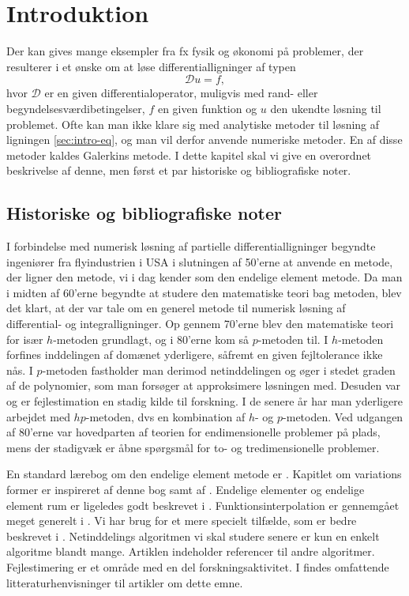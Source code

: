 \chapter{Introduktion}

Der kan gives mange eksempler fra fx fysik og økonomi på problemer,
der resulterer i et ønske om at løse differentialligninger af typen
\begin{equation} \label{sec:intro-eq}
{\mathcal D}u = f,
\end{equation}
hvor $\mathcal D$ er en given differentialoperator, muligvis med rand-
eller be\-gyn\-del\-ses\-vær\-di\-be\-tin\-gel\-ser, $f$ en given
funktion og $u$ den
ukendte løsning til problemet. Ofte kan man ikke klare sig med
analytiske metoder til løsning af ligningen \eqref{sec:intro-eq}, og
man vil derfor anvende numeriske metoder. En af disse metoder kaldes
Galerkins metode. I dette kapitel skal vi give en overordnet
beskrivelse af denne, men først et par historiske og bibliografiske noter.

\section{Historiske og bibliografiske noter}
I forbindelse med numerisk løs\-ning af partielle differentialligninger
begyndte in\-gen\-iører fra flyindustrien i USA i slutningen af 50'erne at
anvende en metode, der ligner den metode, vi i dag kender som den
endelige element metode. Da man i midten af 60'erne begyndte at studere den
matematiske teori bag metoden, blev det klart, at der var tale om en
generel metode til numerisk løsning af differential- og
integralligninger. Op gennem 70'erne blev den matematiske teori for
især $h$-metoden grundlagt, og i 80'erne kom så $p$-metoden til. I
$h$-metoden  forfines ind\-de\-ling\-en af domænet yderligere,
såfremt en given fejltolerance ikke nås. I $p$-metoden
fastholder man derimod netinddelingen og øger i stedet graden af de
polynomier, som man forsøger at approksimere løsningen med.
Desuden var og er fejlestimation en stadig kilde til
forsk\-ning. I de senere år har man yderligere arbejdet med $hp$-metoden, dvs en
kombination af $h$- og $p$-metoden. Ved udgangen af 80'erne var
hovedparten af teorien for endimensionelle problemer på plads, mens
der stadigvæk er åbne spørgsmål for to- og tredimensionelle problemer.

En standard lærebog om den endelige element metode er
\cite{ciarlet78}. Kapitlet om variations former er inspireret af denne
bog samt af \cite{babuska82}. Endelige elementer og endelige element
rum er ligeledes godt beskrevet i \cite{ciarlet78}.
Funktionsinterpolation er gennemgået meget generelt i
\cite{ciarlet78}. Vi har brug for et mere specielt tilfælde, som er
bedre beskrevet i \cite{hugger-pol}. Netinddelings algoritmen vi skal studere
senere er kun en enkelt algoritme blandt mange. Artiklen \cite{hugger-net}
indeholder referencer til andre algoritmer. Fejlestimering er et
område med en del forskningsaktivitet. I
\cite{babuska1,babuska2,babuska3} findes omfattende
litteraturhenvisninger til artikler om dette emne.

